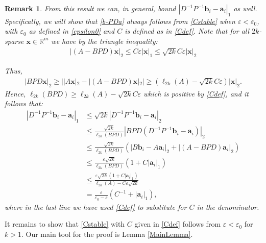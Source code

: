 \documentclass[journal, onecolumn]{IEEEtran}
\newtheorem{remark}{Remark}
\begin{document}
\begin{remark}
From this result we can, in general, bound $|D^{-1}P^{-1}\mathbf{b}_i - \mathbf{a}_i|_1$ as well. Specifically, we will show that \eqref{b-PDa} always follows from \eqref{Cstable} when $\varepsilon < \varepsilon_0$, with $\varepsilon_0$ as defined in \eqref{epsilon0} and $C$ is defined as in \eqref{Cdef}. Note that for all $2k$-sparse $\mathbf{x} \in \mathbb{R}^m$ we have by the triangle inequality:
\begin{align*}
|(A-BPD)\mathbf{x}|_2 
\leq C\varepsilon|\mathbf{x}|_1
\leq \sqrt{2k} C \varepsilon |\mathbf{x}|_2
\end{align*}

Thus,
\begin{align*}
|BPD\mathbf{x}|_2 
\geq | |A\mathbf{x}|_2 - |(A-BPD)\mathbf{x}|_2 |
\geq (\ell_{2k}(A) - \sqrt{2k}C\varepsilon ) |\mathbf{x}|_2.
\end{align*}
Hence, $\ell_{2k}(BPD) \geq \ell_{2k}(A) - \sqrt{2k}C\varepsilon$ which is positive by \eqref{Cdef}, and it follows that:
\begin{align*}
|D^{-1}P^{-1}\mathbf{b}_i - \mathbf{a}_i|_1
&\leq \sqrt{2k} |D^{-1}P^{-1}\mathbf{b}_i - \mathbf{a}_i|_2 \\
&\leq \frac{\sqrt{2k}}{\ell_{2k}(BPD)}|BPD(D^{-1}P^{-1}\mathbf{b}_i - \mathbf{a}_i)|_2 \\
&\leq \frac{\sqrt{2k}}{\ell_{2k}(BPD)} (|B\mathbf{b}_i - A\mathbf{a}_i|_2 + |(A - BPD)\mathbf{a}_i|_2) \\
&\leq \frac{\varepsilon\sqrt{2k}}{\ell_{2k}(BPD)}(1+C|\mathbf{a}_i|_1) \\
&\leq \frac{\varepsilon\sqrt{2k}(1+C|\mathbf{a}_i|_1)}{\ell_{2k}(A) - C\varepsilon\sqrt{2k}} \\
&= \frac{\varepsilon }{\varepsilon_0 - \varepsilon} \left( C^{-1}+|\mathbf{a}_i|_1 \right),
\end{align*}
%
where in the last line we have used \eqref{Cdef} to substitute for $C$ in the denominator.  
\end{remark}


It remains to show that \eqref{Cstable} with $C$ given in \eqref{Cdef} follows from $\varepsilon < \varepsilon_0$ for $k > 1$. Our main tool for the proof is Lemma \ref{MainLemma}.


\end{document}
